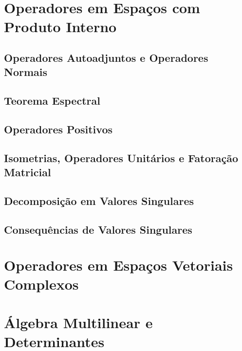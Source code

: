 \documentclass[12pt]{article}
\theoremstyle{plain}
\theoremstyle{definition}
\theoremstyle{remark}
\begin{document}
\section{Operadores em Espaços com Produto Interno}
\subsection{Operadores Autoadjuntos e Operadores Normais}
\subsection{Teorema Espectral}
\subsection{Operadores Positivos}
\subsection{Isometrias, Operadores Unitários e Fatoração Matricial}
\subsection{Decomposição em Valores Singulares}
\subsection{Consequências de Valores Singulares}

\section{Operadores em Espaços Vetoriais Complexos}
\section{Álgebra Multilinear e Determinantes}
\end{document}
